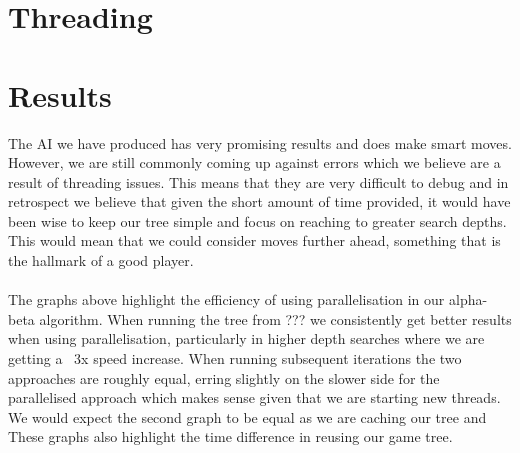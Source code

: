 \documentclass[a4paper, 12pt]{article}
\begin{document}
\section{Threading}

\section{Results}
The AI we have produced has very promising results and does make smart moves. However, we are still commonly coming up against errors which we believe are a result of threading issues. This means that they are very difficult to debug and in retrospect we believe that given the short amount of time provided, it would have been wise to keep our tree simple and focus on reaching to greater search depths. This would mean that we could consider moves further ahead, something that is the hallmark of a good player.\\
\\
The graphs above highlight the efficiency of using parallelisation in our alpha-beta algorithm. When running the tree from ??? we consistently get better results when using parallelisation, particularly in higher depth searches where we are getting a ~3x speed increase. When running subsequent iterations the two approaches are roughly equal, erring slightly on the slower side for the parallelised approach which makes sense given that we are starting new threads. We would expect the second graph to be equal as we are caching our tree and These graphs also highlight the time difference in reusing our game tree.
\end{document}
